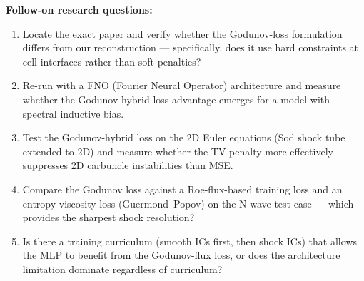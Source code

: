 \noindent\textbf{Follow-on research questions:}
\begin{enumerate}[leftmargin=1.6em,itemsep=0.2em,topsep=0.2em,label=Q\arabic*.]
\item Locate the exact paper and verify whether the Godunov-loss formulation differs from our reconstruction --- specifically, does it use hard constraints at cell interfaces rather than soft penalties?
\item Re-run with a FNO (Fourier Neural Operator) architecture and measure whether the Godunov-hybrid loss advantage emerges for a model with spectral inductive bias.
\item Test the Godunov-hybrid loss on the 2D Euler equations (Sod shock tube extended to 2D) and measure whether the TV penalty more effectively suppresses 2D carbuncle instabilities than MSE.
\item Compare the Godunov loss against a Roe-flux-based training loss and an entropy-viscosity loss (Guermond--Popov) on the N-wave test case --- which provides the sharpest shock resolution?
\item Is there a training curriculum (smooth ICs first, then shock ICs) that allows the MLP to benefit from the Godunov-flux loss, or does the architecture limitation dominate regardless of curriculum?
\end{enumerate}


\clearpage

